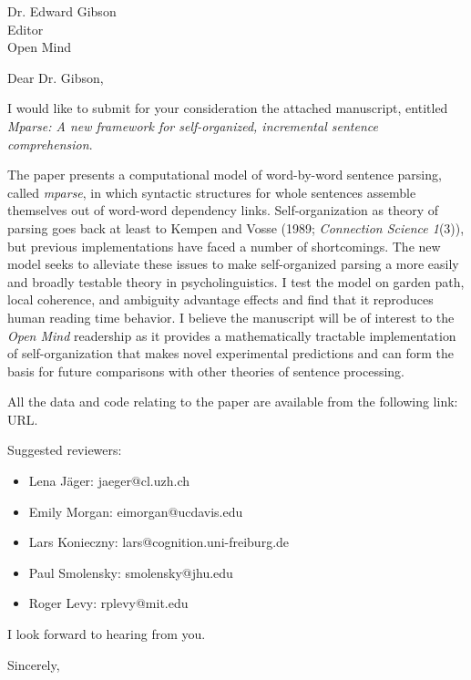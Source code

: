 \documentclass[fontsize=12pt, paper=letter]{scrlttr2}
\begin{document}
\begin{letter}{Dr. Edward Gibson\\
    Editor\\
    Open Mind}

\opening{Dear Dr. Gibson,}

I would like to submit for your consideration the attached manuscript, entitled
\emph{Mparse: A new framework for self-organized, incremental sentence
comprehension}.

The paper presents a computational model of word-by-word sentence parsing,
called \emph{mparse}, in which syntactic structures for whole sentences
assemble themselves out of word-word dependency links. Self-organization as
theory of parsing goes back at least to Kempen and Vosse (1989;
\emph{Connection Science 1}(3)), but previous implementations have faced a
number of shortcomings. The new model seeks to alleviate these issues to
make self-organized parsing a more easily and broadly testable theory in
psycholinguistics. I test the model on garden path, local coherence, and
ambiguity advantage effects and find that it reproduces human reading time
behavior. I believe the manuscript will be of interest to the \emph{Open
Mind} readership as it provides a mathematically tractable implementation
of self-organization that makes novel experimental predictions and can form
the basis for future comparisons with other theories of sentence
processing.

All the data and code relating to the paper are available from the following
    link: URL.

Suggested reviewers:
\begin{itemize}
\item Lena Jäger: jaeger@cl.uzh.ch
\item Emily Morgan: eimorgan@ucdavis.edu
\item Lars Konieczny: lars@cognition.uni-freiburg.de
\item Paul Smolensky: smolensky@jhu.edu
\item Roger Levy: rplevy@mit.edu
\end{itemize}

I look forward to hearing from you. 

\closing{Sincerely,} %


\end{letter}
\end{document}
